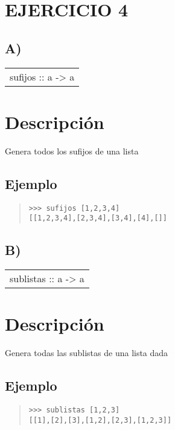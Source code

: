 \section{EJERCICIO 4}
\subsection{A)}
\begin{haddockdesc}
\item[\begin{tabular}{@{}l}
sufijos :: {\char 91}a{\char 93} -> {\char 91}{\char 91}a{\char 93}{\char 93}
\end{tabular}]
{\haddockbegindoc
\section*{Descripción}
Genera todos los sufijos de una lista\par
\subsection*{Ejemplo}
\begin{quote}
{\haddockverb\begin{verbatim}
>>> sufijos [1,2,3,4]
[[1,2,3,4],[2,3,4],[3,4],[4],[]]

\end{verbatim}}
\end{quote}}
\end{haddockdesc}
\subsection{B)}
\begin{haddockdesc}
\item[\begin{tabular}{@{}l}
sublistas :: {\char 91}a{\char 93} -> {\char 91}{\char 91}a{\char 93}{\char 93}
\end{tabular}]
{\haddockbegindoc
\section*{Descripción}
Genera todas las sublistas de una lista dada\par
\subsection*{Ejemplo}
\begin{quote}
{\haddockverb\begin{verbatim}
>>> sublistas [1,2,3]
[[1],[2],[3],[1,2],[2,3],[1,2,3]]

\end{verbatim}}
\end{quote}}
\end{haddockdesc}
